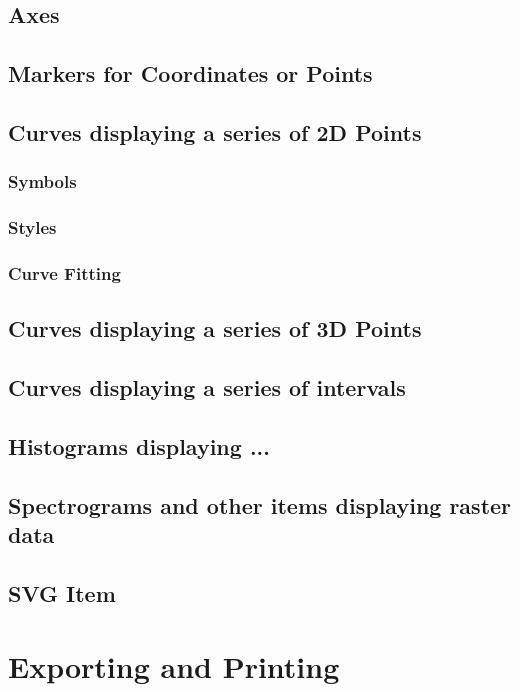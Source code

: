 \documentclass[12pt,a4paper]{book}
\begin{document}
\section{Axes}

\section{Markers for Coordinates or Points}
\section{Curves displaying a series of 2D Points}

\subsection{Symbols}
\subsection{Styles}
\subsection{Curve Fitting}


\section{Curves displaying a series of 3D Points}
\section{Curves displaying a series of intervals}
\section{Histograms displaying ...}

\section{Spectrograms and other items displaying raster data}

\section{SVG Item}

\chapter{Exporting and Printing}
\end{document}

